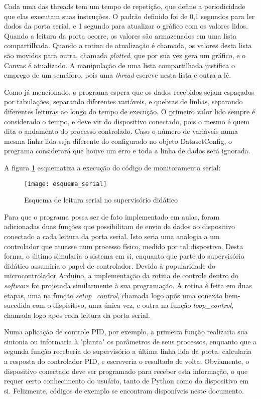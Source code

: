 Cada uma das threads tem um tempo de repetição, que define a periodicidade que elas executam suas instruções. O padrão definido foi de 0,1 segundos para ler dados da porta serial, e 1 segundo para atualizar o gráfico com os valores lidos. Quando a leitura da porta ocorre, os valores são armazenados em uma lista compartilhada. Quando a rotina de atualização é chamada, os valores desta lista são movidos para outra, chamada \emph{plotted}, que por sua vez gera um gráfico, e o Canvas é atualizado. A manipulação de uma lista compartilhada justifica o emprego de um semáforo, pois uma \textit{thread} escreve nesta lista e outra a lê.

Como já mencionado, o programa espera que os dados recebidos sejam espaçados por tabulações, separando diferentes variáveis, e quebras de linhas, separando diferentes leituras ao longo do tempo de execução. O primeiro valor lido sempre é considerado o tempo, e deve vir do dispositivo conectado, pois o mesmo é quem dita o andamento do processo controlado. Caso o número de variáveis numa mesma linha lida seja diferente do configurado no objeto DatasetConfig, o programa considerará que houve um erro e toda a linha de dados será ignorada.

A figura \ref{img_esquema_serial} esquematiza a execução do código de monitoramento serial:

\begin{figure}[hbt]
	\centering
	\caption{Esquema de leitura serial no supervisório didático}
	\texttt{[image: esquema\_serial]}
	\label{img_esquema_serial}
\end{figure}

Para que o programa possa ser de fato implementado em aulas, foram adicionadas duas funções que possibilitam de envio de dados ao dispositivo conectado a cada leitura da porta serial. Isto seria uma analogia a um controlador que atuasse num processo físico, medido por tal dispostivo. Desta forma, o último simularia o sistema em si, enquanto que parte do supervisório didático assumiria o papel de controlador. Devido à popularidade do microcontrolador Arduino, a implementação da rotina de controle dentro do \emph{software} foi projetada similarmente à sua programação. A rotina é feita em duas etapas, uma na função \emph{setup\_control}, chamada logo após uma conexão bem-sucedida com o dispisitivo, uma única vez, e outra na função \emph{loop\_control}, chamada logo após cada leitura da porta serial.

Numa aplicação de controle PID, por exemplo, a primeira função realizaria sua sintonia ou informaria à "planta" os parâmetros de seus processos, enquanto que a segunda função receberia do supervisório a última linha lida da porta, calcularia a resposta do controlador PID, e escreveria o resultado de volta. Obviamente, o dispositivo conectado deve ser programado para receber esta informação, o que requer certo conhecimento do usuário, tanto de Python como do dispositivo em si. Felizmente, códigos de exemplo se encontram disponíveis neste documento.

